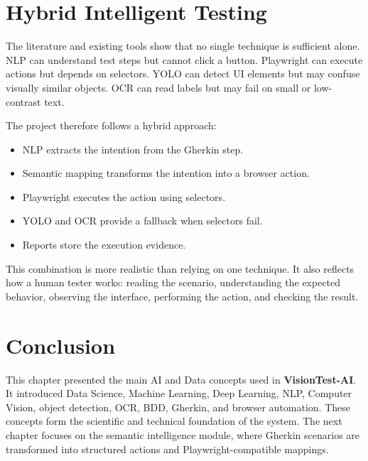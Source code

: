 \section{Hybrid Intelligent Testing}
\label{sec:hybrid_testing_review}

The literature and existing tools show that no single technique is sufficient alone. NLP can understand test steps but cannot click a button. Playwright can execute actions but depends on selectors. YOLO can detect UI elements but may confuse visually similar objects. OCR can read labels but may fail on small or low-contrast text.

The project therefore follows a hybrid approach:

\begin{itemize}
	\item NLP extracts the intention from the Gherkin step.
	\item Semantic mapping transforms the intention into a browser action.
	\item Playwright executes the action using selectors.
	\item YOLO and OCR provide a fallback when selectors fail.
	\item Reports store the execution evidence.
\end{itemize}

This combination is more realistic than relying on one technique. It also reflects how a human tester works: reading the scenario, understanding the expected behavior, observing the interface, performing the action, and checking the result.

\section{Conclusion}
\label{sec:ch2_conclusion}

This chapter presented the main AI and Data concepts used in \textbf{VisionTest-AI}. It introduced Data Science, Machine Learning, Deep Learning, NLP, Computer Vision, object detection, OCR, BDD, Gherkin, and browser automation. These concepts form the scientific and technical foundation of the system. The next chapter focuses on the semantic intelligence module, where Gherkin scenarios are transformed into structured actions and Playwright-compatible mappings.
